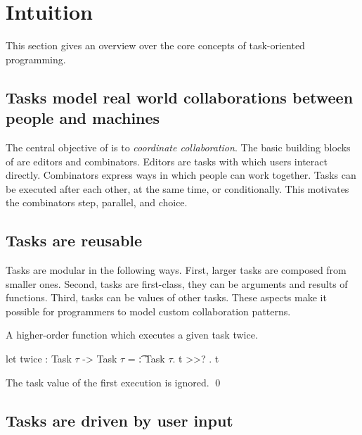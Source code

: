 


\section{Intuition}
\label{sec:intuition}

This section gives an overview over the core concepts of task-oriented programming.



\subsection{Tasks model real world collaborations between people and machines}

The central objective of \TOP is to \emph{coordinate collaboration}.
The basic building blocks of \TOPHAT are editors and combinators.
Editors are tasks with which users interact directly.
Combinators express ways in which people can work together.
Tasks can be executed after each other, at the same time, or conditionally.
This motivates the combinators step, parallel, and choice.


\subsection{Tasks are reusable}

Tasks are modular in the following ways.
First, larger tasks are composed from smaller ones.
Second, tasks are first-class, they can be arguments and results of functions.
Third, tasks can be values of other tasks.
These aspects make it possible for programmers to model custom collaboration patterns.

\begin{example}[Twice]

A higher-order function which executes a given task twice.
\begin{TASK}
  let twice : Task $\tau$ -> Task $\tau$ = \t : Task $\tau$. t >>? \x . t
\end{TASK}
The task value of the first execution is ignored.
\qed

\end{example}



\subsection{Tasks are driven by user input}


